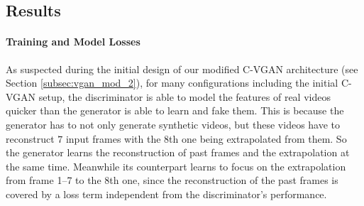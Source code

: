 \subsection{Results} \label{subsec:cvgan_results} %

\paragraph{Training and Model Losses}
As suspected during the initial design of our modified C-VGAN architecture (see Section \ref{subsec:vgan_mod_2}), for many configurations including the initial C-VGAN setup, the discriminator is able to model the features of real videos quicker than the generator is able to learn and fake them. This is because the generator has to not only generate synthetic videos, but these videos have to reconstruct $7$ input frames with the 8th one being extrapolated from them. So the generator learns the reconstruction of past frames and the extrapolation at the same time. Meanwhile its counterpart learns to focus on the extrapolation from frame 1--7 to the 8th one, since the reconstruction of the past frames is covered by a loss term independent from the discriminator's performance. 

